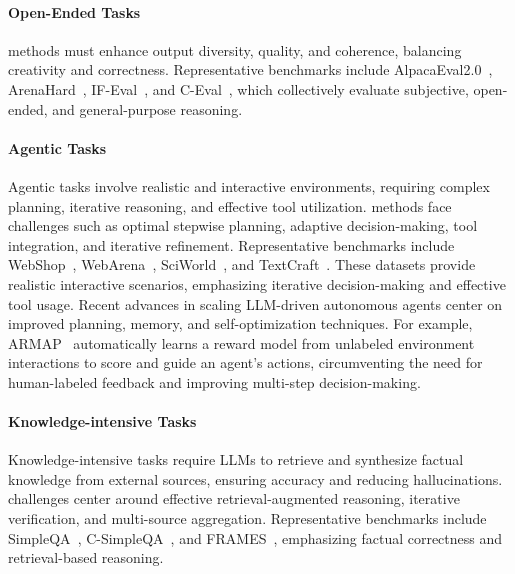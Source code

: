 \paragraph{Open-Ended Tasks}
\TTS methods must enhance output diversity, quality, and coherence, balancing creativity and correctness. Representative benchmarks include AlpacaEval2.0~\citep{dubois2024lengthcontrolledalpacaevalsimpleway}, ArenaHard~\citep{li2024crowdsourceddatahighqualitybenchmarks}, IF-Eval~\citep{zhou2023instructionfollowing}, and C-Eval~\citep{huang2023ceval}, which collectively evaluate subjective, open-ended, and general-purpose reasoning.


\paragraph{Agentic Tasks}
Agentic tasks involve realistic and interactive environments, requiring complex planning, iterative reasoning, and effective tool utilization. \TTS methods face challenges such as optimal stepwise planning, adaptive decision-making, tool integration, and iterative refinement. Representative benchmarks include WebShop~\citep{yao2023webshop}, WebArena~\citep{zhou2023webarena}, SciWorld~\citep{wang2022sciworld}, and TextCraft~\citep{prasad2024adaptasneededdecompositionplanning}. These datasets provide realistic interactive scenarios, emphasizing iterative decision-making and effective tool usage. Recent advances in scaling LLM-driven autonomous agents center on improved planning, memory, and self-optimization techniques. For example, ARMAP~\citep{chen2025scalingautonomousagentsautomatic} automatically learns a reward model from unlabeled environment interactions to score and guide an agent's actions, circumventing the need for human-labeled feedback and improving multi-step decision-making.


\paragraph{Knowledge-intensive Tasks}
Knowledge-intensive tasks require LLMs to retrieve and synthesize factual knowledge from external sources, ensuring accuracy and reducing hallucinations. \TTS challenges center around effective retrieval-augmented reasoning, iterative verification, and multi-source aggregation. Representative benchmarks include SimpleQA~\citep{wei2024measuringshortformfactualitylarge}, C-SimpleQA~\citep{he2024chinesesimpleqachinesefactuality}, and FRAMES~\citep{krishna2025factfetchreasonunified}, emphasizing factual correctness and retrieval-based reasoning.

